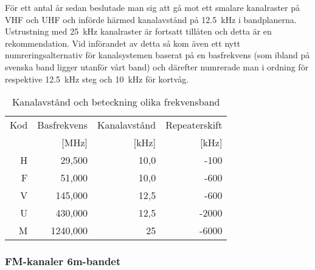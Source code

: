 För ett antal år sedan beslutade man sig att gå mot ett smalare
kanalraster på VHF och UHF och införde härmed kanalavstånd på 12.5~kHz
i bandplanerna. Ustrustning med 25~kHz kanalraster är fortsatt
tillåten och detta är en rekommendation. Vid införandet av detta så
kom även ett nytt numreringsalternativ för kanalsystemen baserat på en
basfrekvens (som ibland på svenska band ligger utanför vårt band) och
därefter numrerade man i ordning för respektive 12.5~kHz steg och
10~kHz för kortvåg.

\begin{table}[h]
\centering
\begin{tabular}{rrrr}
Kod & Basfrekvens & Kanalavstånd & Repeaterskift \\
    & [MHz]       & [kHz]        & [kHz] \\ \hline
H & 29,500 & 10,0 & -100 \\
F & 51,000 & 10,0 & -600 \\
V & 145,000& 12,5 & -600 \\
U & 430,000& 12,5 & -2000 \\
M & 1240,000 & 25 & -6000 \\
\end{tabular}
\label{tab:kanalavstand}
\caption{Kanalavstånd och beteckning olika frekvensband}
\end{table}

\subsubsection{FM-kanaler 6m-bandet}

